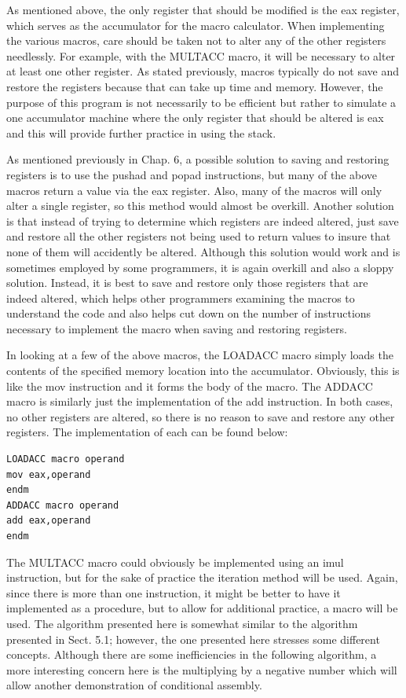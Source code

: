 \documentclass[10pt]{book}
\begin{document}
As mentioned above, the only register that should be modified is the eax register, which serves as the accumulator for the macro calculator. When implementing the various macros, care should be taken not to alter any of the other registers needlessly. For example, with the MULTACC macro, it will be necessary to alter at least one other register. As stated previously, macros typically do not save and restore the registers because that can take up time and memory. However, the purpose of this program is not necessarily to be efficient but rather to simulate a one accumulator machine where the only register that should be altered is eax and this will provide further practice in using the stack.

As mentioned previously in Chap. 6, a possible solution to saving and restoring registers is to use the pushad and popad instructions, but many of the above macros return a value via the eax register. Also, many of the macros will only alter a single register, so this method would almost be overkill. Another solution is that instead of trying to determine which registers are indeed altered, just save and restore all the other registers not being used to return values to insure that none of them will accidently be altered. Although this solution would work and is sometimes employed by some programmers, it is again overkill and also a sloppy solution. Instead, it is best to save and restore only those registers that are indeed altered, which helps other programmers examining the macros to understand the code and also helps cut down on the number of instructions necessary to implement the macro when saving and restoring registers.

In looking at a few of the above macros, the LOADACC macro simply loads the contents of the specified memory location into the accumulator. Obviously, this is like the mov instruction and it forms the body of the macro. The ADDACC macro is similarly just the implementation of the add instruction. In both cases, no other registers are altered, so there is no reason to save and restore any other registers. The implementation of each can be found below:

\begin{verbatim}
LOADACC macro operand
mov eax,operand
endm
ADDACC macro operand
add eax,operand
endm
\end{verbatim}

The MULTACC macro could obviously be implemented using an imul instruction, but for the sake of practice the iteration method will be used. Again, since there is more than one instruction, it might be better to have it implemented as a procedure, but to allow for additional practice, a macro will be used. The algorithm presented here is somewhat similar to the algorithm presented in Sect. 5.1; however, the one presented here stresses some different concepts. Although there are some inefficiencies in the following algorithm, a more interesting concern here is the multiplying by a negative number which will allow another demonstration of conditional assembly.
\end{document}
